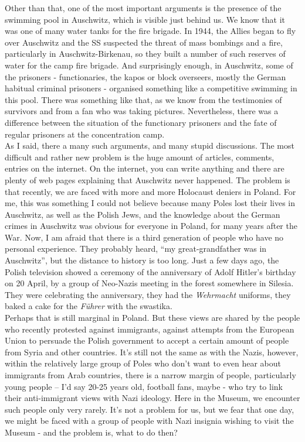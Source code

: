 Other than that, one of the most important arguments is the presence of the swimming pool in Auschwitz, which is visible just behind us. We know that it was one of many water tanks for the fire brigade. In 1944, the Allies began to fly over Auschwitz and the SS suspected the threat of mass bombings and a fire, particularly in Auschwitz-Birkenau, so they built a number of such reserves of water for the camp fire brigade. And surprisingly enough, in Auschwitz, some of the prisoners - functionaries, the kapos or block overseers, mostly the German habitual criminal prisoners - organised something like a competitive swimming in this pool. There was something like that, as we know from the testimonies of survivors and from a fan who was taking pictures. Nevertheless, there was a difference between the situation of the functionary prisoners and the fate of regular prisoners at the concentration camp. \\
As I said, there a many such arguments, and many stupid discussions. The most difficult and rather new problem is the huge amount of articles, comments, entries on the internet. On the internet, you can write anything and there are plenty of web pages explaining that Auschwitz never happened. The problem is that recently, we are faced with more and more Holocaust deniers in Poland. For me, this was something I could not believe because many Poles lost their lives in Auschwitz, as well as the Polish Jews, and the knowledge about the German crimes in Auschwitz was obvious for everyone in Poland, for many years after the War. Now, I am afraid that there is a third generation of people who have no personal experience. They probably heard, ``my great-grandfather was in Auschwitz'', but the distance to history is too long. Just a few days ago, the Polish television showed a ceremony of the anniversary of Adolf Hitler's birthday on 20 April, by a group of Neo-Nazis meeting in the forest somewhere in Silesia. They were celebrating the anniversary, they had the \textit{Wehrmacht} uniforms, they baked a cake for the \textit{Führer} with the swastika.\\ 
Perhaps that is still marginal in Poland. But these views are shared by the people who recently protested against immigrants, against attempts from the European Union to persuade the Polish government to accept a certain amount of people from Syria and other countries. It's still not the same as with the Nazis, however, within the relatively large group of Poles who don't want to even hear about immigrants from Arab countries, there is a narrow margin of people, particularly young people – I’d say 20-25 years old, football fans, maybe - who try to link their anti-immigrant views with Nazi ideology. Here in the Museum, we encounter such people only very rarely. It's not a problem for us, but we fear that one day, we might be faced with a group of people with Nazi insignia wishing to visit the Museum - and the problem is, what to do then?\\
